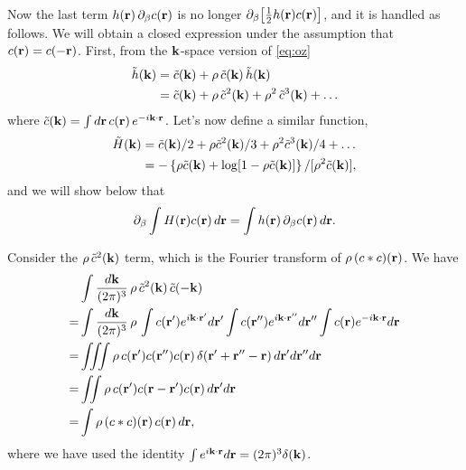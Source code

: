 \documentclass[12pt]{article}
\begin{document}
Now the last term $h(\mathbf{r}) \, \partial_\beta c(\mathbf{r})$
  is no longer $\partial_\beta \big[ \frac{1}{2} h(\mathbf{r}) c(\mathbf{r}) \big]$,
  and it is handled as follows.
%
We will obtain a closed expression under the assumption
  that $c(\mathbf{r}) = c(-\mathbf{r})$.
%
First, from the $\mathbf{k}$-space version of \eqref{eq:oz}
\begin{align*}
  \tilde{h}(\mathbf{k})
  &= \tilde{c}(\mathbf{k}) + \rho \, \tilde{c}(\mathbf{k}) \, \tilde{h}(\mathbf{k}) \\
  &= \tilde{c}(\mathbf{k}) + \rho \, \tilde{c}^2(\mathbf{k})
               + \rho^2 \, \tilde{c}^3(\mathbf{k})
               + \dots
\end{align*}
%
where $\tilde{c}(\mathbf{k}) = \int d\mathbf{r} \, c(\mathbf{r}) \, e^{-i \mathbf{k}\cdot\mathbf{r}}$.
%
Let's now define a similar function,
%
\begin{align*}
  \tilde{H}(\mathbf{k})
  &= \tilde{c}(\mathbf{k})/2
   + \rho \tilde{c}^2(\mathbf{k})/3
   + \rho^2 \tilde{c}^3(\mathbf{k})/4
    + \dots \\
  &= -\left\{
        \rho \tilde{c}(\mathbf{k})
        + \log[1 - \rho \tilde{c}(\mathbf{k})]
    \right\} / [\rho^2 \tilde{c}(\mathbf{k})],
\end{align*}
%
and we will show below that
\begin{equation}
  \partial_\beta \int H(\mathbf{r}) c(\mathbf{r}) \, d \mathbf{r}
  = \int h(\mathbf{r}) \, \partial_\beta c(\mathbf{r}) \, d \mathbf{r}.
  \label{eq:bigH}
\end{equation}




Consider the $\rho \, \tilde{c}^2(\mathbf{k})$ term,
  which is the Fourier transform of $\rho \, (c*c)(\mathbf{r})$.
%
We have
\begin{align*}
&  \int \frac{ d \mathbf{k} }{(2\pi)^3} \,
  \rho \, \tilde{c}^2(\mathbf{k}) \, \tilde{c}(-\mathbf{k}) \\
=&
  \int \frac{ d \mathbf{k} }{(2\pi)^3} \,
    \rho \,
    \int c(\mathbf{r}')  e^{ i \mathbf{k}\cdot \mathbf{r}'}   d \mathbf{r}'
    \int c(\mathbf{r}'') e^{ i \mathbf{k}\cdot \mathbf{r}''}  d \mathbf{r}''
    \int c(\mathbf{r})   e^{-i \mathbf{k}\cdot \mathbf{r}}    d \mathbf{r} \\
=&
    \iiint
    \rho \,
    c(\mathbf{r}') c(\mathbf{r}'') c(\mathbf{r})
    \, \delta(\mathbf{r}' + \mathbf{r}'' - \mathbf{r}) \,
    d \mathbf{r}'
    d \mathbf{r}''
    d \mathbf{r} \\
=&
    \iint
    \rho \,
    c(\mathbf{r}')  c(\mathbf{r} - \mathbf{r}') c(\mathbf{r}) \,
    d \mathbf{r}'
    d \mathbf{r} \\
=&  \int \rho \, (c*c)(\mathbf{r}) \, c(\mathbf{r}) \,
    d \mathbf{r},
\end{align*}
where we have used the identity
$\int e^{i \mathbf{k}\cdot \mathbf{r}} d \mathbf{r} = (2\pi)^3 \delta(\mathbf{k})$.
\end{document}
